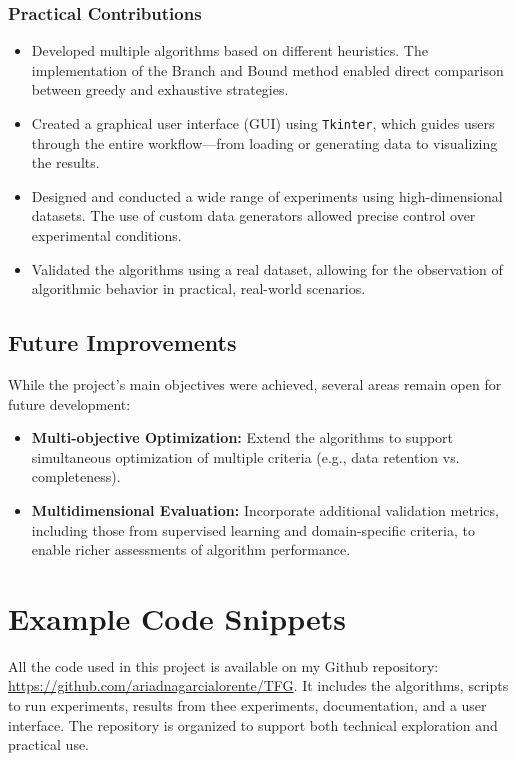 \documentclass[a4paper,12pt]{article}
\begin{document}
\subsubsection{Practical Contributions}
\begin{itemize}
    \item Developed multiple algorithms based on different heuristics. The implementation of the Branch and Bound method enabled direct comparison between greedy and exhaustive strategies.
    
    \item Created a graphical user interface (GUI) using \texttt{Tkinter}, which guides users through the entire workflow—from loading or generating data to visualizing the results.
    
    \item Designed and conducted a wide range of experiments using high-dimensional datasets. The use of custom data generators allowed precise control over experimental conditions.
    
    \item Validated the algorithms using a real dataset, allowing for the observation of algorithmic behavior in practical, real-world scenarios.
\end{itemize}

\subsection{Future Improvements}
While the project's main objectives were achieved, several areas remain open for future development:
\begin{itemize}
    \item \textbf{Multi-objective Optimization:} Extend the algorithms to support simultaneous optimization of multiple criteria (e.g., data retention vs. completeness).
    
    \item \textbf{Multidimensional Evaluation:} Incorporate additional validation metrics, including those from supervised learning and domain-specific criteria, to enable richer assessments of algorithm performance.
\end{itemize}

\newpage
{}
\nocite{*}
\printbibliography[title=Bibliography]
\newpage
\appendix
\section{Example Code Snippets}
All the code used in this project is available on my Github repository: \url{https://github.com/ariadnagarcialorente/TFG}. It includes the algorithms, scripts to run experiments, results from thee experiments, documentation, and a user interface. The repository is organized to support both technical exploration and practical use.
\newpage
\end{document}
